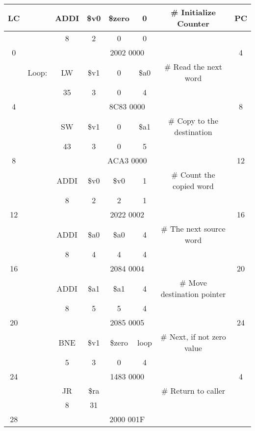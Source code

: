 \documentclass[a4paper,11pt]{article}
\begin{document}
\begin{tabular}{ | c | c | c | c | c | c | c | c | }
  \hline
    LC & & ADDI & \$v0 & \$zero & 0 & \# Initialize Counter & PC \\ \hline
          & & 8 & 2 & 0 & 0 &   &   \\ \hline
     0   &   \multicolumn{6}{|c|}{2002 0000} & 4 \\ \hline
          & Loop: & LW & \$v1 & 0 & \$a0 & \# Read the next word &  \\ \hline
          & & 35 & 3 & 0 & 4 &   &   \\ \hline
     4   &   \multicolumn{6}{|c|}{8C83 0000} & 8 \\ \hline
          & & SW & \$v1 & 0 & \$a1 & \# Copy to the destination &  \\ \hline
          & & 43 & 3 & 0 & 5 &   &   \\ \hline
     8   &   \multicolumn{6}{|c|}{ACA3 0000} & 12 \\ \hline
          & & ADDI & \$v0 & \$v0 & 1 & \# Count the copied word &  \\ \hline
          & & 8 & 2 & 2 & 1 &   &   \\ \hline
     12   &   \multicolumn{6}{|c|}{2022 0002} & 16 \\ \hline
          & & ADDI & \$a0 & \$a0 & 4 & \# The next source word &  \\ \hline
          & & 8 & 4 & 4 & 4 &   &   \\ \hline
     16   &   \multicolumn{6}{|c|}{2084 0004} & 20 \\ \hline
          & & ADDI & \$a1 & \$a1 & 4 & \# Move destination pointer &  \\ \hline
          & & 8 & 5 & 5 & 4 &   &   \\ \hline
     20   &   \multicolumn{6}{|c|}{2085 0005} & 24 \\ \hline
          & & BNE& \$v1 & \$zero & loop & \# Next, if not zero value &  \\ \hline
          & & 5 & 3 & 0 & 4 &   &   \\ \hline
     24   &   \multicolumn{6}{|c|}{1483 0000} & 4 \\ \hline
          & & JR & \$ra &  &  & \# Return to caller &  \\ \hline
          & & 8 & 31 & &  &   &   \\ \hline
     28  &   \multicolumn{6}{|c|}{2000 001F} &  \\ \hline
\end{tabular}

\end{document}
